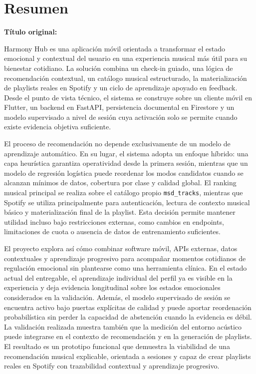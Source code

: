 \chapter*{Resumen}
{}

\noindent\textbf{Título original:} \TituloTFG

\vspace{0.4cm}

Harmony Hub es una aplicación móvil orientada a transformar el estado
emocional y contextual del usuario en una experiencia musical más útil para su
bienestar cotidiano. La solución combina un check-in guiado, una lógica de
recomendación contextual, un catálogo musical estructurado, la materialización
de playlists reales en Spotify y un ciclo de aprendizaje apoyado en feedback.
Desde el punto de vista técnico, el sistema se construye sobre un cliente móvil
en Flutter, un backend en FastAPI, persistencia documental en Firestore y un
modelo supervisado a nivel de sesión cuya activación solo se permite cuando
existe evidencia objetiva suficiente.

El proceso de recomendación no depende exclusivamente de un modelo de
aprendizaje automático. En su lugar, el sistema adopta un enfoque híbrido: una
capa heurística garantiza operatividad desde la primera sesión, mientras que un
modelo de regresión logística puede reordenar los modos candidatos cuando se
alcanzan mínimos de datos, cobertura por clase y calidad global. El ranking
musical principal se realiza sobre el catálogo propio \texttt{msd\_tracks},
mientras que Spotify se utiliza principalmente para autenticación, lectura de
contexto musical básico y materialización final de la playlist. Esta decisión
permite mantener utilidad incluso bajo restricciones externas, como cambios en
endpoints, limitaciones de cuota o ausencia de datos de entrenamiento
suficientes.

El proyecto explora así cómo combinar software móvil, APIs externas, datos
contextuales y aprendizaje progresivo para acompañar momentos cotidianos de
regulación emocional sin plantearse como una herramienta clínica. En el estado
actual del entregable, el aprendizaje individual del perfil ya es visible en la
experiencia y deja evidencia longitudinal sobre los estados emocionales
considerados en la validación. Además, el modelo supervisado de sesión se encuentra activo bajo
puertas explícitas de calidad y puede aportar reordenación probabilística sin
perder la capacidad de abstención cuando la evidencia es débil. La validación
realizada muestra también que la medición del entorno acústico puede integrarse
en el contexto de recomendación y en la generación de playlists. El resultado
es un prototipo funcional que demuestra la viabilidad de una recomendación
musical explicable, orientada a sesiones y capaz de crear playlists reales en
Spotify con trazabilidad contextual y aprendizaje progresivo.
